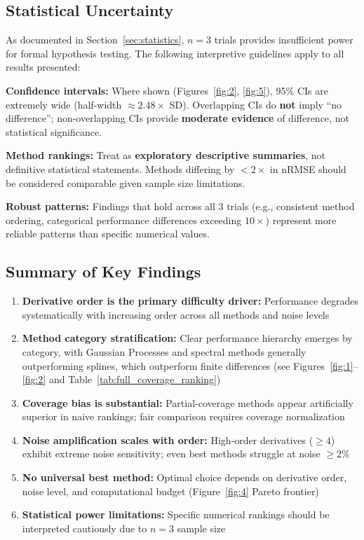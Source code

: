 \subsection{Statistical Uncertainty}
\label{sec:statistical_uncertainty}

As documented in Section~\ref{sec:statistics}, $n=3$ trials provides insufficient power for formal hypothesis testing. The following interpretive guidelines apply to all results presented:

\textbf{Confidence intervals:} Where shown (Figures~\ref{fig:2}, \ref{fig:5}), 95\% CIs are extremely wide (half-width $\approx 2.48 \times$ SD). Overlapping CIs do \textbf{not} imply ``no difference''; non-overlapping CIs provide \textbf{moderate evidence} of difference, not statistical significance.

\textbf{Method rankings:} Treat as \textbf{exploratory descriptive summaries}, not definitive statistical statements. Methods differing by $<2\times$ in nRMSE should be considered comparable given sample size limitations.

\textbf{Robust patterns:} Findings that hold across all 3 trials (e.g., consistent method ordering, categorical performance differences exceeding $10\times$) represent more reliable patterns than specific numerical values.

\subsection{Summary of Key Findings}
\label{sec:key_findings}

\begin{enumerate}
    \item \textbf{Derivative order is the primary difficulty driver:} Performance degrades systematically with increasing order across all methods and noise levels

    \item \textbf{Method category stratification:} Clear performance hierarchy emerges by category, with Gaussian Processes and spectral methods generally outperforming splines, which outperform finite differences (see Figures~\ref{fig:1}--\ref{fig:2} and Table~\ref{tab:full_coverage_ranking})

    \item \textbf{Coverage bias is substantial:} Partial-coverage methods appear artificially superior in naive rankings; fair comparison requires coverage normalization

    \item \textbf{Noise amplification scales with order:} High-order derivatives ($\geq 4$) exhibit extreme noise sensitivity; even best methods struggle at noise $\geq 2\%$

    \item \textbf{No universal best method:} Optimal choice depends on derivative order, noise level, and computational budget (Figure~\ref{fig:4} Pareto frontier)

    \item \textbf{Statistical power limitations:} Specific numerical rankings should be interpreted cautiously due to $n=3$ sample size
\end{enumerate}

